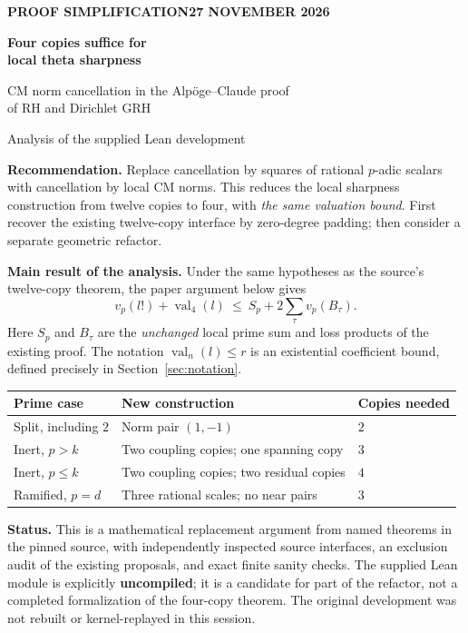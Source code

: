 \documentclass[11pt,letterpaper]{article}
\theoremstyle{remark}\newtheorem{remark}[theorem]{Remark}
\newcommand{\vp}{v_p}
\newcommand{\val}{\operatorname{val}}
\newcommand{\keybox}[1]{\par\smallskip\noindent\colorbox{pale}{\parbox{\dimexpr\linewidth-2\fboxsep\relax}{#1}}\par\smallskip}
\begin{document}
\thispagestyle{empty}
{\sffamily\bfseries\color{accent} PROOF SIMPLIFICATION\hfill 27 NOVEMBER 2026}\par
\vspace{.24in}
{\fontsize{29}{34}\selectfont\bfseries\color{ink}Four copies suffice for\\local theta sharpness\par}
\vspace{.13in}
{\Large CM norm cancellation in the Alp\"oge--Claude proof\\of RH and Dirichlet GRH\par}
\vspace{.18in}
{\large Analysis of the supplied Lean development}\par
\vspace{.18in}
\keybox{\textbf{Recommendation.} Replace cancellation by squares of rational
$p$-adic scalars with cancellation by local CM norms. This reduces the local
sharpness construction from twelve copies to four, with \emph{the same valuation
bound}. First recover the existing twelve-copy interface by zero-degree padding;
then consider a separate geometric refactor.}

\textbf{Main result of the analysis.} Under the same hypotheses as the
source's twelve-copy theorem, the paper argument below gives
\begin{equation*}
 \boxed{\vp(l!)+\val_4(l)\ \leq\ S_p+2\sum_\tau\vp(B_\tau).}
\end{equation*}
Here $S_p$ and $B_\tau$ are the \emph{unchanged} local prime sum and loss
products of the existing proof. The notation $\val_n(l)\leq r$ is an
existential coefficient bound, defined precisely in Section~\ref{sec:notation}.

\begin{center}
\begin{tabular}{lll}
\toprule
Prime case & New construction & Copies needed\\
\midrule
Split, including $2$ & Norm pair $(1,-1)$ & $2$\\
Inert, $p>k$ & Two coupling copies; one spanning copy & $3$\\
Inert, $p\leq k$ & Two coupling copies; two residual copies & $4$\\
Ramified, $p=d$ & Three rational scales; no near pairs & $3$\\
\bottomrule
\end{tabular}
\end{center}

\textbf{Status.} This is a mathematical replacement argument from named
theorems in the pinned source, with independently inspected source interfaces,
an exclusion audit of the existing proposals, and exact finite sanity checks.
The supplied Lean module is explicitly \textbf{uncompiled}; it is a candidate
for part of the refactor, not a completed formalization of the four-copy theorem.
The original development was not rebuilt or kernel-replayed in this session.
\end{document}
